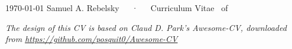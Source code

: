 \documentclass[11pt, letterpaper]{samr-cv}
\begin{document}

\begingroup
\renewcommand{\bibitem}[1]{}%
\endgroup

\vspace{-0.5in}
\makecvheader

\makecvfooter
  {\today}
  {Samuel A. Rebelsky~~~·~~~Curriculum Vitae}
  {\thepage\ of \pageref{LastPage}}









%
%


\vfill
\vhrulefill{0.1mm}
\begin{center}
{\fontsize{8pt}{1em}\bodyfont\itshape\color{lighttext} The design of this CV is based on Claud D. Park's Awesome-CV, downloaded from
\href{https://github.com/posquit0/Awesome-CV}{https://github.com/posquit0/Awesome-CV}}
\end{center}
\end{document}
